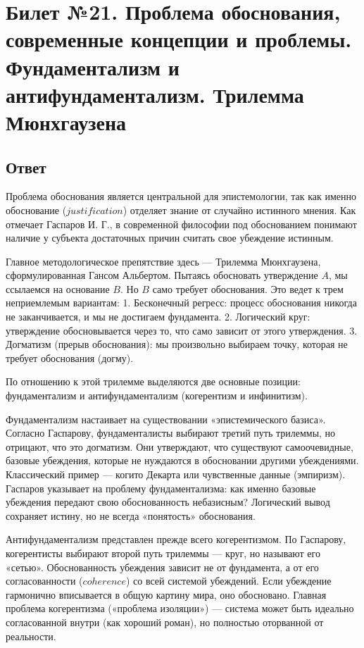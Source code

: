 \documentclass[a4paper,12pt]{article}
\begin{document}
\newpage
\section{Билет №21. Проблема обоснования, современные концепции и проблемы. Фундаментализм и антифундаментализм. Трилемма Мюнхгаузена}

\subsection{Ответ}

Проблема обоснования является центральной для эпистемологии, так как именно обоснование ($justification$) отделяет знание от случайно истинного мнения. Как отмечает Гаспаров И. Г., в современной философии под обоснованием понимают наличие у субъекта достаточных причин считать свое убеждение истинным.

Главное методологическое препятствие здесь — Трилемма Мюнхгаузена, сформулированная Гансом Альбертом. Пытаясь обосновать утверждение $A$, мы ссылаемся на основание $B$. Но $B$ само требует обоснования. Это ведет к трем неприемлемым вариантам:
1. Бесконечный регресс: процесс обоснования никогда не заканчивается, и мы не достигаем фундамента.
2. Логический круг: утверждение обосновывается через то, что само зависит от этого утверждения.
3. Догматизм (прерыв обоснования): мы произвольно выбираем точку, которая не требует обоснования (догму).

По отношению к этой трилемме выделяются две основные позиции: фундаментализм и антифундаментализм (когерентизм и инфинитизм).

Фундаментализм настаивает на существовании «эпистемического базиса». Согласно Гаспарову, фундаменталисты выбирают третий путь трилеммы, но отрицают, что это догматизм. Они утверждают, что существуют самоочевидные, базовые убеждения, которые не нуждаются в обосновании другими убеждениями. Классический пример — когито Декарта или чувственные данные (эмпиризм). Гаспаров указывает на проблему фундаментализма: как именно базовые убеждения передают свою обоснованность небазисным? Логический вывод сохраняет истину, но не всегда «понятость» обоснования.

Антифундаментализм представлен прежде всего когерентизмом. По Гаспарову, когерентисты выбирают второй путь трилеммы — круг, но называют его «сетью». Обоснованность убеждения зависит не от фундамента, а от его согласованности ($coherence$) со всей системой убеждений. Если убеждение гармонично вписывается в общую картину мира, оно обосновано. Главная проблема когерентизма («проблема изоляции») — система может быть идеально согласованной внутри (как хороший роман), но полностью оторванной от реальности.
\end{document}
